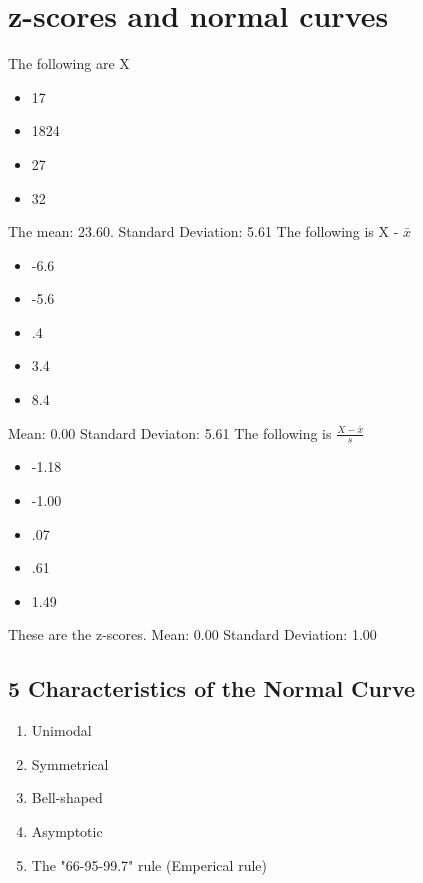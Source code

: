 \documentclass[11pt]{report}
\begin{document}
\section{z-scores and normal curves}
{
    \begin{multicols}{3}
        The following are X
        \begin{itemize}
            \item 17
            \item 1824
            \item 27
            \item 32
        \end{itemize}
        The mean: 23.60. 
        Standard Deviation: 5.61
        \columnbreak
        The following is X - $\bar{x}$
        \begin{itemize}
            \item -6.6
            \item -5.6
            \item .4
            \item 3.4
            \item 8.4
        \end{itemize}
        Mean: 0.00 
        Standard Deviaton: 5.61 
        \columnbreak
        The following is $\frac{X - \bar{x}}{s}$
        \begin{itemize}
            \item -1.18
            \item -1.00
            \item .07
            \item .61
            \item 1.49
        \end{itemize}
        These are the z-scores. 
        Mean: 0.00
        Standard Deviation: 1.00
    \end{multicols}
}

\subsection{5 Characteristics of the Normal Curve}
\begin{enumerate}
    \item Unimodal
    \item Symmetrical
    \item Bell-shaped
    \item Asymptotic
    \item The "66-95-99.7" rule (Emperical rule)
\end{enumerate}
\end{document}
